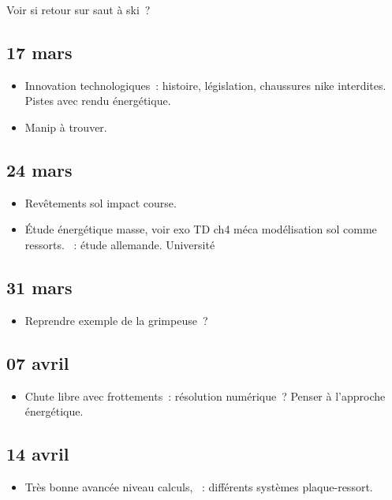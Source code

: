 \documentclass[a4paper, 11pt, final, garamond]{book}
\begin{document}
\begin{center}
    Voir si retour sur saut à ski~?
\end{center}

\subsection{17 mars}
\begin{itemize}
    \item Innovation technologiques~: histoire, législation, chaussures nike
        interdites. Pistes avec rendu énergétique.
    \item Manip à trouver.
\end{itemize}

\subsection{24 mars}
\begin{itemize}
    \item Revêtements sol impact course.
    \item Étude énergétique masse, voir exo TD ch4 méca modélisation sol comme
        ressorts.
    ~: étude allemande. Université
\end{itemize}

\subsection{31 mars}
\begin{itemize}
  ~: quelle piste permet les meilleures performances sportives~?
  ~: jambe bâton, sol constante de raideur et évolution énergie
    mécanique avec $k$~?
  \item Reprendre exemple de la grimpeuse~?
\end{itemize}

\subsection{07 avril}
\begin{itemize}
  \item Chute libre avec frottements~: résolution numérique~? Penser à
    l'approche énergétique.
\end{itemize}

\subsection{14 avril}
\begin{itemize}
  \item Très bonne avancée niveau calculs,
  ~: différents systèmes plaque-ressort.
\end{itemize}
\end{document}
